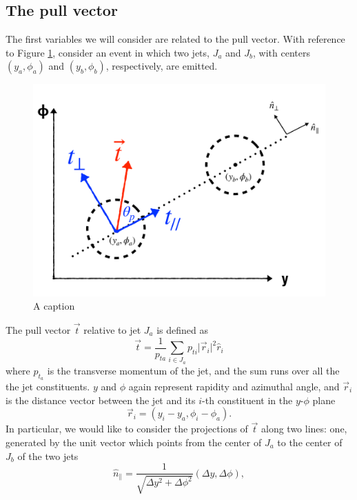 \documentclass[10pt,a4paper]{book}
\begin{document}
\subsection{The pull vector}
The first variables we will consider are related to the pull vector. With reference to Figure \ref{Pull vector}, consider an event in which two jets, $J_a$ and $J_b$, with centers $(y_a, \phi_a)$ and $(y_b, \phi_b)$, respectively, are emitted.
\begin{figure}
\centering
\includegraphics[scale=0.3]{ch4_images/pull_components}
\caption{A caption}
\label{Pull vector}
\end{figure}
The pull vector $\vec{t}$ relative to jet $J_a$ is defined as
\begin{equation}
\vec{t} = \frac{1}{p_{ta}} \sum_{i \in J_a}p_{ti}\vert \vec{r}_i \vert^2 \hat{r}_i
\end{equation}
where $p_{t_a}$ is the transverse momentum of the jet, and the sum runs over all the the jet constituents. $y$ and $\phi$ again represent rapidity and azimuthal angle, and $\vec{r}_i$ is the distance vector between the jet and its $i$-th constituent in the $y$-$\phi$ plane
\begin{equation}
\vec{r}_i = (y_i - y_a, \phi_i - \phi_a).
\end{equation}
In particular, we would like to consider the projections of $\vec{t}$ along two lines: one, generated by the unit vector which points from the center of $J_a$ to the center of $J_b$ of the two jets
\begin{equation}
\hat{n}_\parallel = \frac{1}{\sqrt{\Delta y^2 + \Delta \phi^2}}\left(\Delta y, \Delta \phi \right),
\end{equation}
\end{document}
